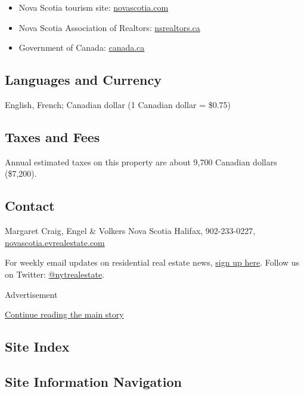 \begin{itemize}
\item
  Nova Scotia tourism site:
  \href{http://novascotia.com/}{novascotia.com}
\item
  Nova Scotia Association of Realtors:
  \href{http://nsrealtors.ca/}{nsrealtors.ca}
\item
  Government of Canada: \href{http://canada.ca/}{canada.ca}
\end{itemize}

\hypertarget{languages-and-currency}{%
\subsection{Languages and Currency}\label{languages-and-currency}}

English, French; Canadian dollar (1 Canadian dollar = \$0.75)

\hypertarget{taxes-and-fees}{%
\subsection{Taxes and Fees}\label{taxes-and-fees}}

Annual estimated taxes on this property are about 9,700 Canadian dollars
(\$7,200).

\hypertarget{contact}{%
\subsection{Contact}\label{contact}}

Margaret Craig, Engel \& Volkers Nova Scotia Halifax, 902-233-0227,
\href{http://novascotia.evrealestate.com/}{novascotia.evrealestate.com}

For weekly email updates on residential real estate news,
\href{http://www.nytimes.com/newsletters/realestate/}{sign up here}.
Follow us on Twitter:
\href{https://twitter.com/nytrealestate}{@nytrealestate}.

Advertisement

\protect\hyperlink{after-bottom}{Continue reading the main story}

\hypertarget{site-index}{%
\subsection{Site Index}\label{site-index}}

\hypertarget{site-information-navigation}{%
\subsection{Site Information
Navigation}\label{site-information-navigation}}


